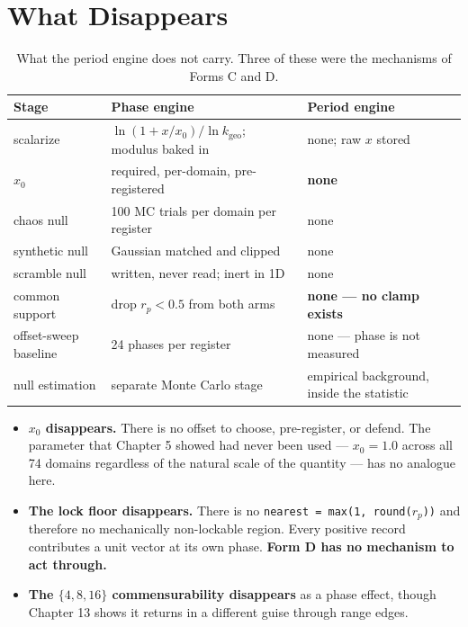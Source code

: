 \documentclass[11pt, letterpaper, openany]{book}
\newcommand{\kgeo}{k_{\mathrm{geo}}}
\begin{document}
\section{What Disappears}

\begin{table}[H]
\centering
\small
\begin{tabular}{@{}lll@{}}
\toprule
\textbf{Stage} & \textbf{Phase engine} & \textbf{Period engine} \\
\midrule
scalarize & $\ln(1+x/x_0)/\ln \kgeo$; modulus baked in & none; raw $x$ stored \\
$x_0$ & required, per-domain, pre-registered & \textbf{none} \\
chaos null & 100 MC trials per domain per register & none \\
synthetic null & Gaussian matched and clipped & none \\
scramble null & written, never read; inert in 1D & none \\
common support & drop $r_p < 0.5$ from both arms & \textbf{none --- no clamp exists} \\
offset-sweep baseline & 24 phases per register & none --- phase is not measured \\
null estimation & separate Monte Carlo stage & empirical background, inside the statistic \\
\bottomrule
\end{tabular}
\caption{What the period engine does not carry. Three of these were the mechanisms of Forms C
and D.}
\end{table}

\begin{itemize}
    \item \textbf{$x_0$ disappears.} There is no offset to choose, pre-register, or defend.
          The parameter that Chapter 5 showed had never been used --- $x_0 = 1.0$ across all 74
          domains regardless of the natural scale of the quantity --- has no analogue here.
    \item \textbf{The lock floor disappears.} There is no
          \texttt{nearest = max(1, round($r_p$))} and therefore no mechanically non-lockable
          region. Every positive record contributes a unit vector at its own phase.
          \textbf{Form D has no mechanism to act through.}
    \item \textbf{The $\{4,8,16\}$ commensurability disappears} as a phase effect, though
          Chapter 13 shows it returns in a different guise through range edges.
\end{itemize}
\end{document}
